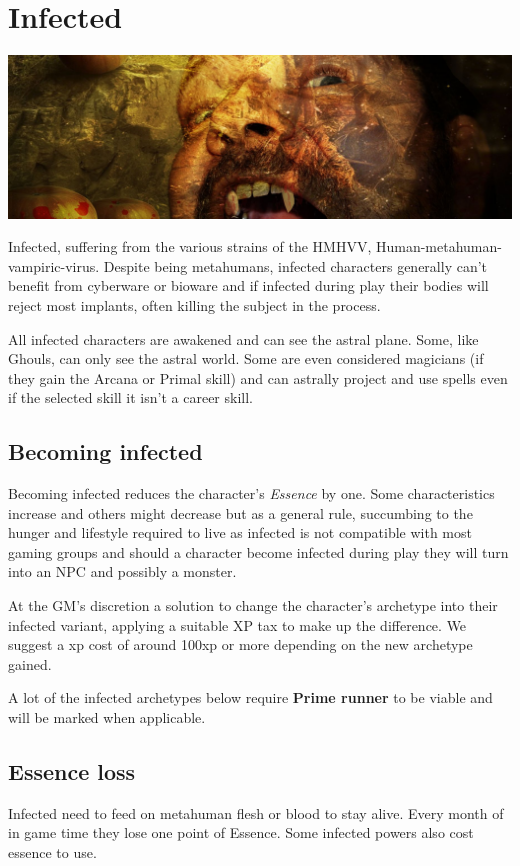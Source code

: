 \documentclass{book}
\begin{document}
\section{Infected}
\begin{center}
	\includegraphics[width=1\linewidth]{images/piqsels.com-id-znuch}
\end{center}
\begin{multicols}{2}
Infected, suffering from the various strains of the HMHVV, Human-metahuman-vampiric-virus. Despite being metahumans, infected characters generally can't benefit from cyberware or bioware and if infected during play their bodies will reject most implants, often killing the subject in the process. 

All infected characters are awakened and can see the astral plane. Some, like Ghouls, can only see the astral world. Some are even considered magicians (if they gain the Arcana or Primal skill) and can astrally project and use spells even if the selected skill it isn't a career skill. 

\subsection{Becoming infected}
\label{sec:gettinginfected}
Becoming infected reduces the character's \textit{Essence} by one. Some characteristics increase and others might decrease but as a general rule, succumbing to the hunger and lifestyle required to live as infected is not compatible with most gaming groups and should a character become infected during play they will turn into an NPC and possibly a monster.

At the GM's discretion a solution to change the character's archetype into their infected variant, applying a suitable XP tax to make up the difference. We suggest a xp cost of around 100xp or more depending on the new archetype gained. 

A lot of the infected archetypes below require \textbf{Prime runner} to be viable and will be marked when applicable. 

\subsection{Essence loss}
\label{sec:essenseloss}
Infected need to feed on metahuman flesh or blood to stay alive. Every month of in game time they lose one point of Essence. Some infected powers also cost essence to use. 


\end{multicols}
\end{document}
